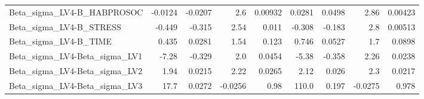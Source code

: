\begin{tabular}{lrrrrrrrr}
Beta\_sigma\_LV4-B\_HABPROSOC    &     -0.0124 &      -0.0207 &     2.6 &  0.00932 &     0.0281 &      0.0498 &         2.86 &       0.00423 \\
Beta\_sigma\_LV4-B\_STRESS       &      -0.449 &       -0.315 &    2.54 &    0.011 &     -0.308 &      -0.183 &          2.8 &       0.00513 \\
Beta\_sigma\_LV4-B\_TIME         &       0.435 &       0.0281 &    1.54 &    0.123 &      0.746 &      0.0527 &          1.7 &        0.0898 \\
Beta\_sigma\_LV4-Beta\_sigma\_LV1 &       -7.28 &       -0.329 &     2.0 &   0.0454 &      -5.38 &      -0.358 &         2.26 &        0.0238 \\
Beta\_sigma\_LV4-Beta\_sigma\_LV2 &        1.94 &       0.0215 &    2.22 &   0.0265 &       2.12 &       0.026 &          2.3 &        0.0217 \\
Beta\_sigma\_LV4-Beta\_sigma\_LV3 &        17.7 &       0.0272 & -0.0256 &     0.98 &      110.0 &       0.197 &      -0.0275 &         0.978 \\
\bottomrule
\end{tabular}
